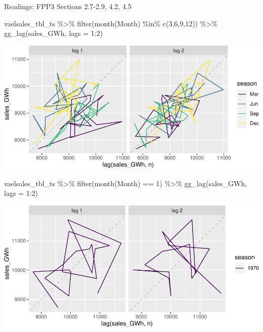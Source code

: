 \documentclass[
]{book}
\newenvironment{Shaded}{\begin{snugshade}}{\end{snugshade}}
\newcommand{\AttributeTok}[1]{\textcolor[rgb]{0.77,0.63,0.00}{#1}}
\newcommand{\DecValTok}[1]{\textcolor[rgb]{0.00,0.00,0.81}{#1}}
\newcommand{\FunctionTok}[1]{\textcolor[rgb]{0.00,0.00,0.00}{#1}}
\newcommand{\NormalTok}[1]{#1}
\newcommand{\SpecialCharTok}[1]{\textcolor[rgb]{0.00,0.00,0.00}{#1}}
\begin{document}
Readings: FPP3 Sections 2.7-2.9, 4.2, 4.5

\begin{Shaded}
\begin{Highlighting}[]
\NormalTok{vaelsales\_tbl\_ts  }\SpecialCharTok{\%\textgreater{}\%} \FunctionTok{filter}\NormalTok{(}\FunctionTok{month}\NormalTok{(Month) }\SpecialCharTok{\%in\%} \FunctionTok{c}\NormalTok{(}\DecValTok{3}\NormalTok{,}\DecValTok{6}\NormalTok{,}\DecValTok{9}\NormalTok{,}\DecValTok{12}\NormalTok{)) }\SpecialCharTok{\%\textgreater{}\%} \FunctionTok{gg\_lag}\NormalTok{(sales\_GWh, }\AttributeTok{lags =} \DecValTok{1}\SpecialCharTok{:}\DecValTok{2}\NormalTok{)}
\end{Highlighting}
\end{Shaded}

\includegraphics{graphics/plot lagged values 2-1.pdf}

\begin{Shaded}
\begin{Highlighting}[]
\NormalTok{vaelsales\_tbl\_ts  }\SpecialCharTok{\%\textgreater{}\%} \FunctionTok{filter}\NormalTok{(}\FunctionTok{month}\NormalTok{(Month) }\SpecialCharTok{==} \DecValTok{1}\NormalTok{) }\SpecialCharTok{\%\textgreater{}\%} \FunctionTok{gg\_lag}\NormalTok{(sales\_GWh, }\AttributeTok{lags =} \DecValTok{1}\SpecialCharTok{:}\DecValTok{2}\NormalTok{)}
\end{Highlighting}
\end{Shaded}

\includegraphics{graphics/plot lagged values 2-2.pdf}
\end{document}
